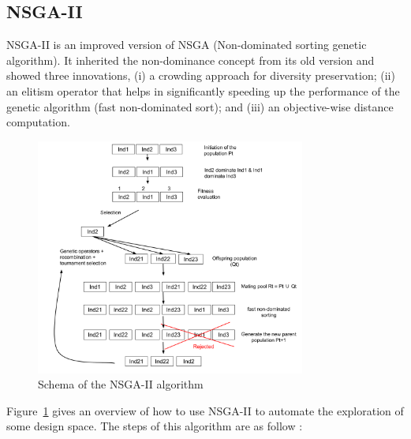 \documentclass[conference]{IEEEtran}
\begin{document}
\subsection{NSGA-II}
NSGA-II is an improved version of NSGA\cite{Srinivas94multiobjectiveoptimization} (Non-dominated sorting genetic algorithm). It inherited the non-dominance concept from its old version and showed three innovations, (i) a crowding approach for diversity preservation; (ii) an elitism operator that helps in significantly speeding up the performance of the genetic algorithm (fast non-dominated sort); and (iii) an objective-wise distance computation. 

\begin{figure}[!t]
\centering
\includegraphics[width=3.49in]{NSGAII.pdf}
\caption{Schema of the NSGA-II algorithm}
\label{nsgaii}
\end{figure}

Figure~\ref{nsgaii} gives an overview of how to use NSGA-II to automate the exploration of some design space. The steps of this algorithm are as follow :
\end{document}
